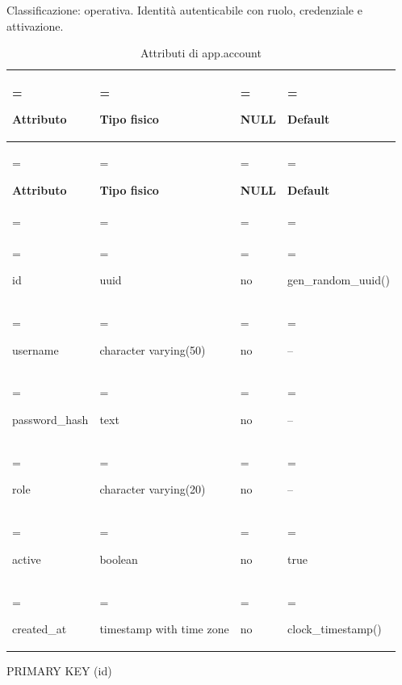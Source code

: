 \documentclass[11pt,a4paper]{article}
\begin{document}
Classificazione: operativa. Identità autenticabile con ruolo, credenziale e attivazione.

{\small \renewcommand{\arraystretch}{1.2}

\begin{xltabular}{\linewidth}{>{\hsize\linewidth=\hsize\raggedright\arraybackslash}X>{\hsize\linewidth=\hsize\raggedright\arraybackslash}X>{\hsize\linewidth=\hsize\raggedright\arraybackslash}X>{\hsize\linewidth=\hsize\raggedright\arraybackslash}X}
\caption{Attributi di app.account}\label{tab:dictionary-5}\\
\toprule

\textbf{Attributo} & \textbf{Tipo fisico} & \textbf{NULL} & \textbf{Default}\\\midrule\endfirsthead\toprule\textbf{Attributo} & \textbf{Tipo fisico} & \textbf{NULL} & \textbf{Default}\\\midrule\endhead
\midrule{}\\\endfoot\bottomrule\endlastfoot


{\ttfamily\small id} & {\ttfamily\small uuid} & no & {\ttfamily\small gen\_\allowbreak{}random\_\allowbreak{}uuid(\allowbreak{})}\\\addlinespace[3pt]

{\ttfamily\small username} & {\ttfamily\small character varying(\allowbreak{}50)} & no & {\ttfamily\small --}\\\addlinespace[3pt]

{\ttfamily\small password\_\allowbreak{}hash} & {\ttfamily\small text} & no & {\ttfamily\small --}\\\addlinespace[3pt]

{\ttfamily\small role} & {\ttfamily\small character varying(\allowbreak{}20)} & no & {\ttfamily\small --}\\\addlinespace[3pt]

{\ttfamily\small active} & {\ttfamily\small boolean} & no & {\ttfamily\small true}\\\addlinespace[3pt]

{\ttfamily\small created\_\allowbreak{}at} & {\ttfamily\small timestamp with time zone} & no & {\ttfamily\small clock\_\allowbreak{}timestamp(\allowbreak{})}\\*

\end{xltabular}}

{\ttfamily\small PRIMARY KEY (\allowbreak{}id)}\par
\end{document}

